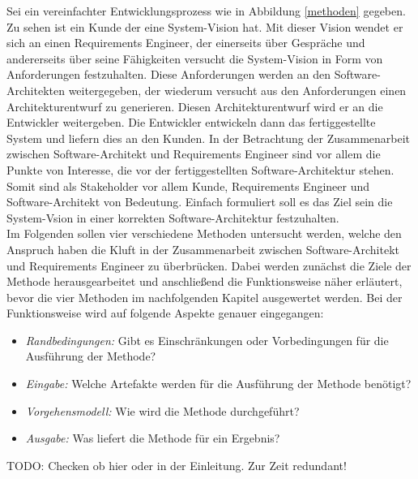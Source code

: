 Sei ein vereinfachter Entwicklungsprozess wie in Abbildung \ref{methoden} gegeben. Zu sehen ist ein Kunde der eine System-Vision hat. Mit dieser Vision wendet er sich an einen Requirements Engineer, der einerseits über Gespräche und andererseits über seine Fähigkeiten versucht die System-Vision in Form von Anforderungen festzuhalten. Diese Anforderungen werden an den Software-Architekten weitergegeben, der wiederum versucht aus den Anforderungen einen Architekturentwurf zu generieren. Diesen Architekturentwurf wird er an die Entwickler weitergeben. Die Entwickler entwickeln dann das fertiggestellte System und liefern dies an den Kunden. In der Betrachtung der Zusammenarbeit zwischen Software-Architekt und Requirements Engineer sind vor allem die Punkte von Interesse, die vor der fertiggestellten Software-Architektur stehen. Somit sind als Stakeholder vor allem Kunde, Requirements Engineer und Software-Architekt von Bedeutung. Einfach formuliert soll es das Ziel sein die System-Vsion in einer korrekten Software-Architektur festzuhalten.\\

Im Folgenden sollen vier verschiedene Methoden untersucht werden, welche den Anspruch haben die Kluft in der Zusammenarbeit zwischen Software-Architekt und Requirements Engineer zu überbrücken. Dabei werden zunächst die Ziele der Methode herausgearbeitet und anschließend die Funktionsweise näher erläutert, bevor die vier Methoden im nachfolgenden Kapitel ausgewertet werden. Bei der Funktionsweise wird auf folgende Aspekte genauer eingegangen: \\

\begin{itemize}
\item \textit{Randbedingungen:} Gibt es Einschränkungen oder Vorbedingungen für die Ausführung der Methode?
\item \textit{Eingabe:} Welche Artefakte werden für die Ausführung der Methode benötigt?
\item \textit{Vorgehensmodell:} Wie wird die Methode durchgeführt?
\item \textit{Ausgabe:} Was liefert die Methode für ein Ergebnis? \\
\end{itemize}

TODO: Checken ob hier oder in der Einleitung. Zur Zeit redundant! \\




